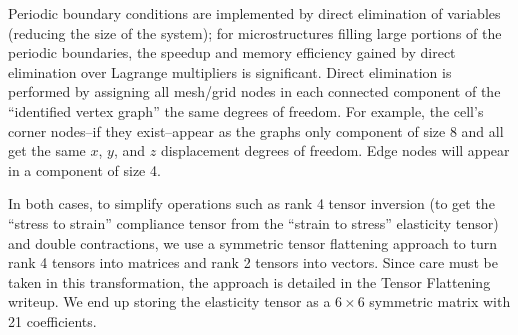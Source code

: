 \documentclass[10pt]{article}
\begin{document}
Periodic boundary conditions are implemented by direct elimination of
variables (reducing the size of the system); for microstructures filling large
portions of the periodic boundaries, the speedup and memory efficiency gained
by direct elimination over Lagrange multipliers is significant.
Direct elimination is performed by
assigning all mesh/grid nodes in each connected component of the ``identified
vertex graph'' the same degrees of freedom. For example, the cell's corner
nodes--if they exist--appear as the graphs only component of size 8 and all get
the same $x$, $y$, and $z$ displacement degrees of freedom. Edge nodes will
appear in a component of size 4.

In both cases, to simplify operations such as rank 4 tensor inversion (to get
the ``stress to strain'' compliance tensor from the ``strain to stress'' elasticity
tensor) and double contractions, we use a symmetric tensor flattening approach
to turn rank 4 tensors into matrices and rank 2 tensors into vectors. Since
care must be taken in this transformation, the approach is detailed in the
Tensor Flattening writeup. We end up storing the elasticity tensor as a $6\times
6$
symmetric matrix with 21 coefficients.



\end{document}
